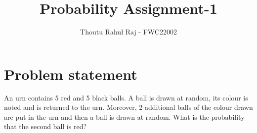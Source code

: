 \documentclass{article}
\begin{document}
\newcommand{\BEQA}{\begin{eqnarray}}
\newcommand{\EEQA}{\end{eqnarray}}
\newcommand{\define}{\stackrel{\triangle}{=}}

\raggedbottom
\setlength{\parindent}{0pt}
\providecommand{\mbf}{\mathbf}
\providecommand{\pr}[1]{\ensuremath{\Pr\left(#1\right)}}
\providecommand{\qfunc}[1]{\ensuremath{Q\left(#1\right)}}
\providecommand{\sbrak}[1]{\ensuremath{{}\left[#1\right]}}
\providecommand{\lsbrak}[1]{\ensuremath{{}\left[#1\right.}}
\providecommand{\rsbrak}[1]{\ensuremath{{}\left.#1\right]}}
\providecommand{\brak}[1]{\ensuremath{\left(#1\right)}}
\providecommand{\lbrak}[1]{\ensuremath{\left(#1\right.}}
\providecommand{\rbrak}[1]{\ensuremath{\left.#1\right)}}
\providecommand{\cbrak}[1]{\ensuremath{\left\{#1\right\}}}
\providecommand{\lcbrak}[1]{\ensuremath{\left\{#1\right.}}
\providecommand{\rcbrak}[1]{\ensuremath{\left.#1\right\}}}
\theoremstyle{remark}
\title{Probability Assignment-1}
\author{\Large Thoutu Rahul Raj - FWC22002}
\date{}
\maketitle
\setcounter{enumi}{3}
\setcounter{enumii}{6}
\section*{\large Problem statement}
An urn contains 5 red and 5 black balls. A ball is drawn at random, its colour is noted and is returned to the urn. Moreover, 2 additional balls of the colour drawn are put in the urn and then a ball is drawn at random. What is the probability that the second ball is red?
\end{document}
